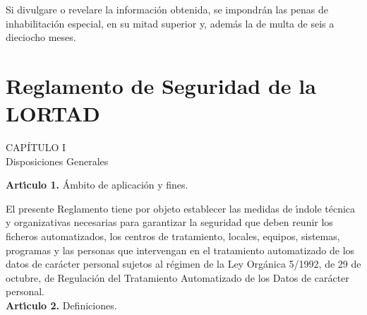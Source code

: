 Si divulgare o revelare la informaci\'on obtenida, se impondr\'an las 
penas de inhabilitaci\'on especial, en su mitad superior y, adem\'as la de 
multa de seis a dieciocho meses.
\cleardoublepage
\section{Reglamento de Seguridad de la LORTAD}
\begin{center}
{\LARGE CAP\'ITULO I}\\ {\large Disposiciones Generales}
\end{center}
\vspace{0.3cm}
{\large {\bf Art\'{\i}culo 1.} \'Ambito de aplicaci\'on y fines.}

El presente Reglamento tiene por objeto establecer las medidas de \'{\i}ndole 
t\'ecnica y organizativas necesarias para garantizar la seguridad que deben 
reunir los ficheros automatizados, los centros de tratamiento, locales, equipos,
sistemas, programas y las personas que intervengan en el tratamiento 
automatizado de los datos de car\'acter personal sujetos al r\'egimen de la 
Ley Org\'anica 5/1992, de 29 de octubre, de Regulaci\'on del Tratamiento 
Automatizado de los Datos de car\'acter personal.
\vspace{0.3cm}\\
{\large {\bf Art\'{\i}culo 2.} Definiciones.}

